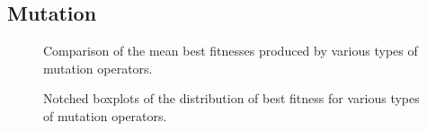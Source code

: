 \documentclass[12pt,twocolumn,oneside]{osajnl}
\begin{document}
\subsection{Mutation}
\begin{figure}[htbp]
\centering
{}
\caption{Comparison of the mean best fitnesses produced by various types of mutation operators.}
\label{fig:mg}
\end{figure}

\begin{figure}[htbp]
\centering
{}
\caption{Notched boxplots of the distribution of best fitness for various types of mutation operators.}
\label{fig:bpm}
\end{figure}
\end{document}
